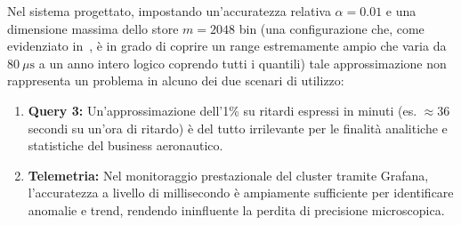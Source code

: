 \documentclass[conference]{IEEEtran}
\begin{document}
Nel sistema progettato, impostando un'accuratezza relativa $\alpha = 0.01$ e una dimensione massima dello store $m = 2048$ bin (una configurazione che, come evidenziato in~\cite{masson2019ddsketch}, è in grado di coprire un range estremamente ampio che varia da $80\ \mu\text{s}$ a un anno intero logico coprendo tutti i quantili) tale approssimazione non rappresenta un problema in alcuno dei due scenari di utilizzo:
\begin{enumerate}
    \item \textbf{Query 3:} Un'approssimazione dell'1\% su ritardi espressi in minuti (es. $\approx 36$ secondi su un'ora di ritardo) è del tutto irrilevante per le finalità analitiche e statistiche del business aeronautico.
    \item \textbf{Telemetria:} Nel monitoraggio prestazionale del cluster tramite Grafana, l'accuratezza a livello di millisecondo è ampiamente sufficiente per identificare anomalie e trend, rendendo ininfluente la perdita di precisione microscopica.
\end{enumerate}
\end{document}
